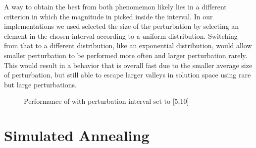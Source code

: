 A way to obtain the best from both phenomemon likely lies in a different criterion in which the magnitude in picked inside the interval.
In our implementations we used selected the size of the perturbation by selecting an element in the chosen interval according to a uniform distribution.
Switching from that to a different distribution, like an exponential distribution, would allow smaller perturbation to be performed more often and larger perturbation rarely.
This would result in a behavior that is overall fast due to the smaller average size of perturbation, but still able to escape larger valleys in solution space using rare but large perturbations.

\begin{figure}[htbp]
	\centering
	\caption{Performance of with perturbation interval set to [5,10]} \label{fig:vnsCost}
\end{figure}


\newpage

\section{Simulated Annealing}


